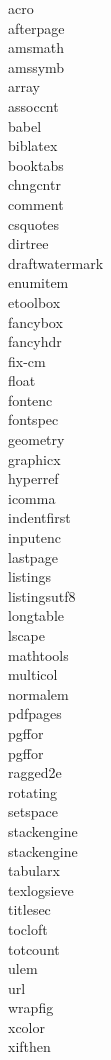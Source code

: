 \begin{appendices}
\begin{multicols}{3}
    \noindent
    acro\\
    afterpage\\
    amsmath\\
    amssymb\\
    array\\
    assoccnt\\
    babel\\
    biblatex\\
    booktabs\\
    chngcntr\\
    comment\\
    csquotes\\
    dirtree\\
    draftwatermark\\
    enumitem\\
    etoolbox\\
    fancybox\\
    fancyhdr\\
    fix-cm\\
    float\\
    fontenc\\
    fontspec\\
    geometry\\
    graphicx\\
    hyperref\\
	icomma\\
    indentfirst\\
    inputenc\\
    lastpage\\
    listings\\
    listingsutf8\\
    longtable\\
    lscape\\
    mathtools\\
    multicol\\
    normalem\\
    pdfpages\\
    pgffor\\
    pgffor\\
    ragged2e\\
    rotating\\
    setspace\\
    stackengine\\
    stackengine\\
    tabularx\\
    texlogsieve\\
    titlesec\\
    tocloft\\
    totcount\\
    ulem\\
    url\\
    wrapfig\\
    xcolor\\
    xifthen

\end{multicols}
\end{appendices}